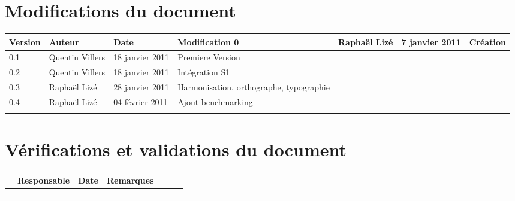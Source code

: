 
\section*{Modifications du document}

\begin{center}
\begin{longtable}{|m{14mm}|m{36mm}|m{36mm}|m{60mm}|}
\hline
Version & Auteur & Date & Modification\endhead \hline
0
& %
Raphaël Lizé
& %
7 janvier 2011
& %
Création
\\\hline
0.1
& %
Quentin Villers
& %
18 janvier 2011
& %
Premiere Version
\\\hline
0.2
& %
Quentin Villers
& %
18 janvier 2011
& %
Intégration S1
\\\hline
0.3
& %
Raphaël Lizé
& %
28 janvier 2011
& %
Harmonisation, orthographe, typographie
\\\hline
0.4
& %
Raphaël Lizé
& %
04 février 2011
& %
Ajout benchmarking
\\\hline
& %
& %
& %
\\\hline
\end{longtable}
\end{center}


\section*{Vérifications et validations du document}

\begin{center}
\begin{longtable}{|m{15mm}|m{36mm}|m{36mm}|m{60mm}|}
\hline
 & Responsable & Date & Remarques\endhead \hline
& %
& %
& %
\\\hline

& %

& %

& %

\\\hline

& %

& %

& %

\\\hline
\end{longtable}
\end{center}

\pagebreak

